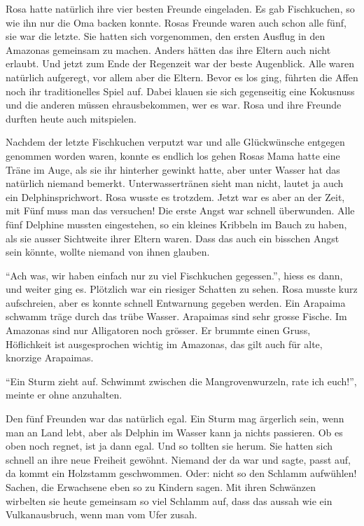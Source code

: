 Rosa hatte natürlich ihre vier besten Freunde eingeladen. Es gab Fischkuchen, so wie ihn nur die Oma backen konnte. Rosas Freunde waren auch schon alle fünf, sie war die letzte. Sie hatten sich vorgenommen, den ersten Ausflug in den Amazonas gemeinsam zu machen. Anders hätten das ihre Eltern auch nicht erlaubt. Und jetzt zum Ende der Regenzeit war der beste Augenblick. Alle waren natürlich aufgeregt, vor allem aber die Eltern. Bevor es los ging, führten die Affen noch ihr traditionelles Spiel auf. Dabei klauen sie sich gegenseitig eine Kokusnuss und die anderen müssen ehrausbekommen, wer es war. Rosa und ihre Freunde durften heute auch mitspielen.

Nachdem der letzte Fischkuchen verputzt war und alle Glückwünsche entgegen genommen worden waren, konnte es endlich los gehen Rosas Mama hatte eine Träne im Auge, als sie ihr hinterher gewinkt hatte, aber unter Wasser hat das natürlich niemand bemerkt. Unterwassertränen sieht man nicht, lautet ja auch ein Delphinsprichwort. Rosa wusste es trotzdem. Jetzt war es aber an der Zeit, mit Fünf muss man das versuchen! Die erste Angst war schnell überwunden. Alle fünf Delphine mussten eingestehen, so ein kleines Kribbeln im Bauch zu haben, als sie ausser Sichtweite ihrer Eltern waren. Dass das auch ein bisschen Angst sein könnte, wollte niemand von ihnen glauben.

\enquote{Ach was, wir haben einfach nur zu viel Fischkuchen gegessen.}, hiess es dann, und weiter ging es. Plötzlich war ein riesiger Schatten zu sehen. Rosa musste kurz aufschreien, aber es konnte schnell Entwarnung gegeben werden. Ein Arapaima schwamm träge durch das trübe Wasser. Arapaimas sind sehr grosse Fische. Im Amazonas sind nur Alligatoren noch grösser. Er brummte einen Gruss, Höflichkeit ist ausgesprochen wichtig im Amazonas, das gilt auch für alte, knorzige Arapaimas.

\enquote{Ein Sturm zieht auf. Schwimmt zwischen die Mangrovenwurzeln, rate ich euch!}, meinte er ohne anzuhalten. 

Den fünf Freunden war das natürlich egal. Ein Sturm mag ärgerlich sein, wenn man an Land lebt, aber als Delphin im Wasser kann ja nichts passieren. Ob es oben noch regnet, ist ja dann egal. Und so tollten sie herum. Sie hatten sich schnell an ihre neue Freiheit gewöhnt. Niemand der da war und sagte, passt auf, da kommt ein Holzstamm geschwommen. Oder: nicht so den Schlamm aufwühlen! Sachen, die Erwachsene eben so zu Kindern sagen. Mit ihren Schwänzen wirbelten sie heute gemeinsam so viel Schlamm auf, dass das aussah wie ein Vulkanausbruch, wenn man vom Ufer zusah.

